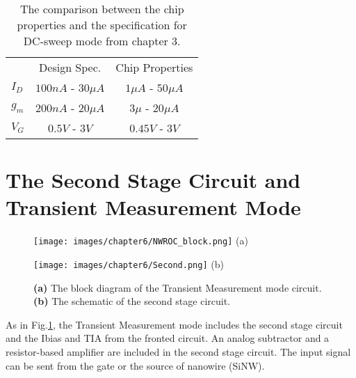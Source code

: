 \begin{table}[tbh!]
    {\fontfamily{}\fontsize{10}{14}\selectfont
    \centering
    \begin{tabular}{l|c|c}
        & Design Spec. & Chip Properties  \\
        $I_D$ & $100n A$ - $30\mu A$ & $1\mu A$ - $50\mu A$ \\
        \hline
        $g_m$ & $200n A$ - $20\mu A$& $3\mu $ - $20\mu A$\\
        \hline
        $V_G$ & $0.5V$ - $3V$ &  $0.45V$ - $3V$\\
    \end{tabular}
        \caption{The comparison between the chip properties and the specification for DC-sweep mode from chapter 3.}
        \label{tb:chip:gvtR}
    }
\end{table}

\section{The Second Stage Circuit and Transient Measurement Mode}
\begin{figure}[tb!hp]
    \begin{minipage}[t]{0.5\textwidth}
        \centering
        \texttt{[image: images/chapter6/NWROC\_block.png]}
        \raggedleft
        (a)
    \end{minipage}
    \hfill
    \begin{minipage}[t]{0.5\textwidth}
        \centering
        \texttt{[image: images/chapter6/Second.png]}
        \raggedleft
        (b)
    \end{minipage}
    \caption{\textbf{(a)} The block diagram of the Transient Measurement mode circuit. \textbf{(b)} The schematic of the second stage circuit.}
    \label{fig:chip:ACschem}
\end{figure}

As in Fig.\ref{fig:chip:ACschem}, the Transient Measurement mode includes the second stage circuit and the Ibias and TIA from the fronted circuit.
An analog subtractor and a resistor-based amplifier are included in the second stage circuit.
The input signal can be sent from the gate or the source of nanowire (SiNW).




